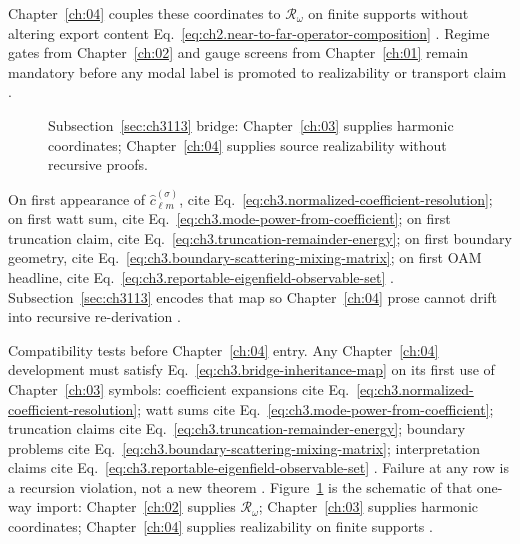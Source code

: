Chapter~\ref{ch:04} couples these coordinates to
\(\mathcal{R}_\omega\) on finite supports without altering export content
Eq.~\eqref{eq:ch2.near-to-far-operator-composition} \cite{stratton1941}. Regime gates from
Chapter~\ref{ch:02} and gauge screens from Chapter~\ref{ch:01} remain mandatory before any modal label is promoted to
realizability or transport claim \cite{belinfante1940}.

\begin{figure}[t]
\centering
{}
\caption{Subsection~\ref{sec:ch3113} bridge: Chapter~\ref{ch:03} supplies harmonic coordinates; Chapter~\ref{ch:04} supplies source realizability without recursive proofs.}
\label{fig:ch3.3113-bridge}
\end{figure}

On first appearance of \(\widehat{c}_{\ell m}^{(\sigma)}\), cite Eq.~\eqref{eq:ch3.normalized-coefficient-resolution}; on first watt sum, cite Eq.~\eqref{eq:ch3.mode-power-from-coefficient}; on first truncation claim, cite Eq.~\eqref{eq:ch3.truncation-remainder-energy}; on first boundary geometry, cite Eq.~\eqref{eq:ch3.boundary-scattering-mixing-matrix}; on first OAM headline, cite Eq.~\eqref{eq:ch3.reportable-eigenfield-observable-set}
\cite{harrington2001}. Subsection~\ref{sec:ch3113} encodes that map so Chapter~\ref{ch:04} prose cannot drift into recursive re-derivation
\cite{harrington2001}.

Compatibility tests before Chapter~\ref{ch:04} entry. Any Chapter~\ref{ch:04} development must satisfy Eq.~\eqref{eq:ch3.bridge-inheritance-map} on its first use of Chapter~\ref{ch:03} symbols:
coefficient expansions cite Eq.~\eqref{eq:ch3.normalized-coefficient-resolution}; watt sums cite Eq.~\eqref{eq:ch3.mode-power-from-coefficient};
truncation claims cite Eq.~\eqref{eq:ch3.truncation-remainder-energy}; boundary problems cite Eq.~\eqref{eq:ch3.boundary-scattering-mixing-matrix};
interpretation claims cite Eq.~\eqref{eq:ch3.reportable-eigenfield-observable-set} \cite{harrington2001}.
Failure at any row is a recursion violation, not a new theorem \cite{stratton1941}. Figure~\ref{fig:ch3.3113-bridge} is the schematic
of that one-way import: Chapter~\ref{ch:02} supplies \(\mathcal{R}_\omega\); Chapter~\ref{ch:03} supplies harmonic coordinates; Chapter~\ref{ch:04}
supplies realizability on finite supports \cite{devaney2004}.

